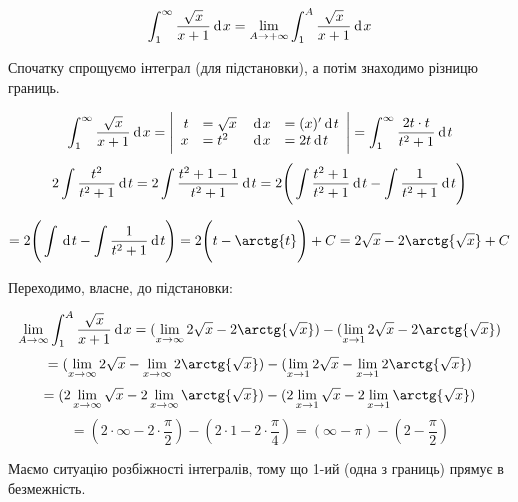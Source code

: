 {}

$$
  \int^\infty_1 \dfrac{\sqrt{x}}{x+1}\hspace{2pt}\text{d}\hspace{1pt}{x}
= \lim_{A \to +\infty} \int^A_1 \dfrac{\sqrt{x}}{x+1}\hspace{2pt}\text{d}\hspace{1pt}{x}
$$

Спочатку спрощуємо інтеграл (для підстановки), а потім знаходимо різницю границь.

$$
\int^\infty_1 \dfrac{\sqrt{x}}{x+1}\hspace{2pt}\text{d}\hspace{1pt}{x} =
 \Bigg|
  \begin{array}{rl rl}
    t & = \sqrt{x} & \hspace{2pt}\text{d}\hspace{1pt}{x} & = (x)'\hspace{2pt}\text{d}\hspace{1pt}{t} \\
    x & = t^2 & \hspace{2pt}\text{d}\hspace{1pt}{x} & = 2t\hspace{2pt}\text{d}\hspace{1pt}{t}
    \end{array}
 \Bigg| = \int^\infty_1 \dfrac{2t \cdot t }{t^2+1}\hspace{2pt}\text{d}\hspace{1pt}{t}
$$
$$
  2 \int \dfrac{t^2}{t^2+1}\hspace{2pt}\text{d}\hspace{1pt}{t}
= 2 \int \dfrac{t^2+1 - 1}{t^2+1}\hspace{2pt}\text{d}\hspace{1pt}{t}
= 2 \Bigg( \int \dfrac{t^2+1}{t^2+1}\hspace{2pt}\text{d}\hspace{1pt}{t}  - \int \dfrac{1}{t^2+1}\hspace{2pt}\text{d}\hspace{1pt}{t} \Bigg)
$$

$$
= 2 \Bigg( \int\d{t}  - \int \dfrac{1}{t^2+1}\d{t} \Bigg)
= 2 \Bigg( t - \arctg{t} \Bigg) + C
= 2\sqrt{x} - 2\arctg{\sqrt{x}} + C
$$

Переходимо, власне, до підстановки:

$$
   \lim_{A \to \infty} \int^{A}_1 \dfrac{\sqrt{x}}{x+1}\d{x}
= (\lim_{x \to \infty} 2\sqrt{x} - 2\arctg{\sqrt{x}} ) - (\lim_{x \to 1} 2\sqrt{x} - 2\arctg{\sqrt{x}} )
$$
$$
= (\lim_{x \to \infty} 2\sqrt{x} - \lim_{x \to \infty} 2\arctg{\sqrt{x}} ) - (\lim_{x \to 1} 2\sqrt{x} - \lim_{x \to 1} 2\arctg{\sqrt{x}} )
$$
$$
= (2\lim_{x \to \infty} \sqrt{x} - 2\lim_{x \to \infty} \arctg{\sqrt{x}} ) - (2\lim_{x \to 1} \sqrt{x} - 2\lim_{x \to 1} \arctg{\sqrt{x}} )
$$
$$
= (2 \cdot \infty - 2 \cdot \dfrac{\pi}{2} ) - (2 \cdot 1 - 2 \cdot \dfrac{\pi}{4} )
= (\infty - \pi ) - (2 - \dfrac{\pi}{2} )
$$

Маємо ситуацію розбіжності інтегралів, тому що 1-ий (одна з границь) прямує в безмежність.
